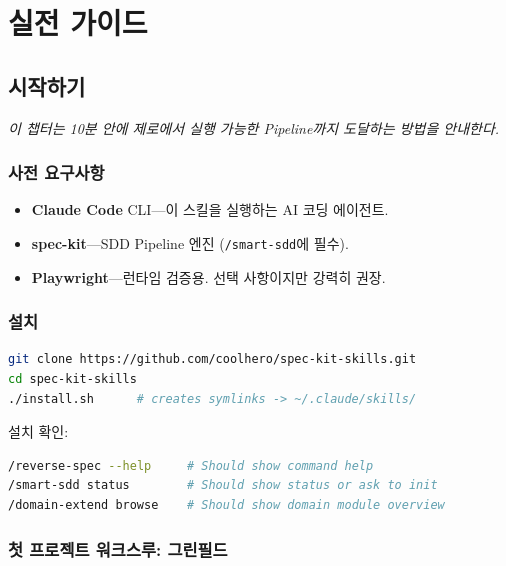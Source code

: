 \documentclass[11pt,a4paper,openright,twoside]{report}
\newcommand{\cmd}[1]{\texttt{/#1}}
\begin{document}
\part{실전 가이드}

\chapter{시작하기}
\label{ch:getting-started}

\textit{이 챕터는 10분 안에 제로에서 실행 가능한 Pipeline까지 도달하는 방법을 안내한다.}

\section{사전 요구사항}

\begin{itemize}
  \item \textbf{Claude Code} CLI---이 스킬을 실행하는 AI 코딩 에이전트.
  \item \textbf{spec-kit}---SDD Pipeline 엔진 (\cmd{smart-sdd}에 필수).
  \item \textbf{Playwright}---런타임 검증용. 선택 사항이지만 강력히 권장.
\end{itemize}

\section{설치}

\begin{lstlisting}[language=bash]
git clone https://github.com/coolhero/spec-kit-skills.git
cd spec-kit-skills
./install.sh      # creates symlinks -> ~/.claude/skills/
\end{lstlisting}

설치 확인:
\begin{lstlisting}[language=bash]
/reverse-spec --help     # Should show command help
/smart-sdd status        # Should show status or ask to init
/domain-extend browse    # Should show domain module overview
\end{lstlisting}

\section{첫 프로젝트 워크스루: 그린필드}
\end{document}

